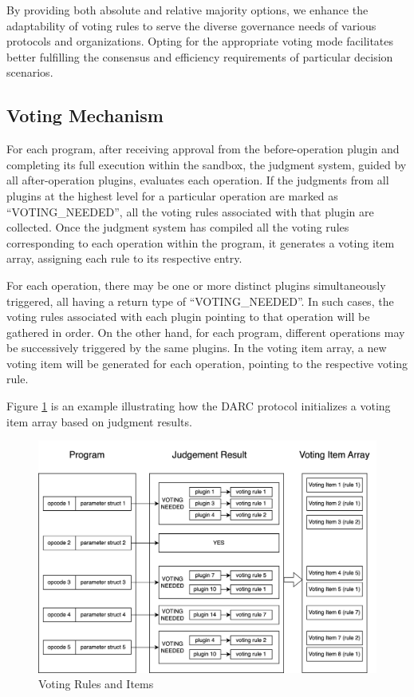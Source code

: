 \documentclass[main.tex]{subfiles}
\begin{document}
By providing both absolute and relative majority options, we enhance the adaptability of voting rules to serve the diverse governance needs of various protocols and organizations. Opting for the appropriate voting mode facilitates better fulfilling the consensus and efficiency requirements of particular decision scenarios.

\subsection{Voting Mechanism}

For each program, after receiving approval from the before-operation plugin and completing its full execution within the sandbox, the judgment system, guided by all after-operation plugins, evaluates each operation. If the judgments from all plugins at the highest level for a particular operation are marked as ``VOTING\_NEEDED'', all the voting rules associated with that plugin are collected. Once the judgment system has compiled all the voting rules corresponding to each operation within the program, it generates a voting item array, assigning each rule to its respective entry.


For each operation, there may be one or more distinct plugins simultaneously triggered, all having a return type of ``VOTING\_NEEDED''. In such cases, the voting rules associated with each plugin pointing to that operation will be gathered in order. On the other hand, for each program, different operations may be successively triggered by the same plugins. In the voting item array, a new voting item will be generated for each operation, pointing to the respective voting rule.

Figure \ref{fig:voting_item} is an example illustrating how the DARC protocol initializes a voting item array based on judgment results.

\begin{figure}
\centering
\includegraphics[width=1\linewidth]{voting_item.drawio.png}
\caption{\label{fig:voting_item}Voting Rules and Items}
\end{figure}
\end{document}
